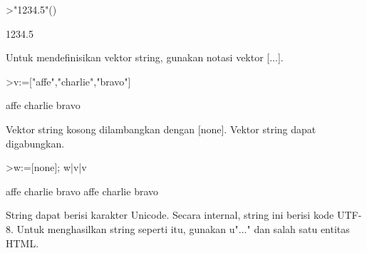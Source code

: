 \begin{eulernotebook}
\begin{eulerprompt}
>"1234.5"()
\end{eulerprompt}
\begin{euleroutput}
  1234.5
\end{euleroutput}
\begin{eulercomment}
Untuk mendefinisikan vektor string, gunakan notasi vektor [...].
\end{eulercomment}
\begin{eulerprompt}
>v:=["affe","charlie","bravo"]
\end{eulerprompt}
\begin{euleroutput}
  affe
  charlie
  bravo
\end{euleroutput}
\begin{eulercomment}
Vektor string kosong dilambangkan dengan [none]. Vektor string dapat
digabungkan.
\end{eulercomment}
\begin{eulerprompt}
>w:=[none]; w|v|v
\end{eulerprompt}
\begin{euleroutput}
  affe
  charlie
  bravo
  affe
  charlie
  bravo
\end{euleroutput}
\begin{eulercomment}
String dapat berisi karakter Unicode. Secara internal, string ini
berisi kode UTF-8. Untuk menghasilkan string seperti itu, gunakan
u"..." dan salah satu entitas HTML.



\end{eulercomment}
\end{eulernotebook}
